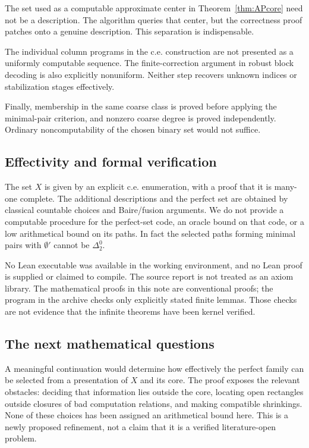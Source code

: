 \documentclass[11pt,a4paper]{article}
\theoremstyle{definition}\newtheorem{definition}[theorem]{Definition}
\theoremstyle{remark}\newtheorem{remark}[theorem]{Remark}
\begin{document}
The set used as a computable approximate center in
Theorem~\ref{thm:APcore} need not be a description. The algorithm queries that
center, but the correctness proof patches onto a genuine description. This
separation is indispensable.

The individual column programs in the c.e. construction are not presented as
a uniformly computable sequence. The finite-correction argument in robust
block decoding is also explicitly nonuniform. Neither step recovers unknown
indices or stabilization stages effectively.

Finally, membership in the same coarse class is proved before applying the
minimal-pair criterion, and nonzero coarse degree is proved independently.
Ordinary noncomputability of the chosen binary set would not suffice.

\subsection{Effectivity and formal verification}
The set $X$ is given by an explicit c.e. enumeration, with a proof that it is
many-one complete. The additional descriptions and the perfect set are
obtained by classical countable choices and Baire/fusion arguments. We do not
provide a computable procedure for the perfect-set code, an oracle bound on
that code, or a low arithmetical bound on its paths. In fact the selected paths
forming minimal pairs with $\emptyset'$ cannot be $\Delta^0_2$.

No Lean executable was available in the working environment, and no Lean
proof is supplied or claimed to compile. The source report is not treated as
an axiom library. The mathematical proofs in this note are conventional
proofs; the program in the archive checks only explicitly stated finite
lemmas. Those checks are not evidence that the infinite theorems have been
kernel verified.

\subsection{The next mathematical questions}
A meaningful continuation would determine how effectively the perfect family
can be selected from a presentation of $X$ and its core. The proof exposes
the relevant obstacles: deciding that information lies outside the core,
locating open rectangles outside closures of bad computation relations, and
making compatible shrinkings. None of these choices has been assigned an
arithmetical bound here. This is a newly proposed refinement, not a claim that
it is a verified literature-open problem.
\end{document}
